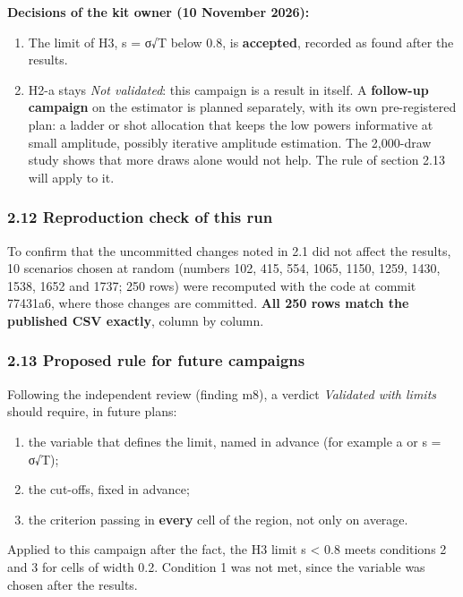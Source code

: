 \documentclass[
  10pt,
]{article}
\providecommand{\tightlist}{%
  \setlength{\itemsep}{0pt}\setlength{\parskip}{0pt}}
\begin{document}
\textbf{Decisions of the kit owner (10 November 2026):}

\begin{enumerate}
\def\labelenumi{\arabic{enumi}.}
\tightlist
\item
  The limit of H3, s = σ√T below 0.8, is \textbf{accepted}, recorded as
  found after the results.
\item
  H2-a stays \emph{Not validated}: this campaign is a result in itself.
  A \textbf{follow-up campaign} on the estimator is planned separately,
  with its own pre-registered plan: a ladder or shot allocation that
  keeps the low powers informative at small amplitude, possibly
  iterative amplitude estimation. The 2,000-draw study shows that more
  draws alone would not help. The rule of section 2.13 will apply to it.
\end{enumerate}

\hypertarget{212-reproduction-check-of-this-run}{%
\subsubsection{2.12 Reproduction check of this
run}\label{212-reproduction-check-of-this-run}}

To confirm that the uncommitted changes noted in 2.1 did not affect the
results, 10 scenarios chosen at random (numbers 102, 415, 554, 1065,
1150, 1259, 1430, 1538, 1652 and 1737; 250 rows) were recomputed with
the code at commit 77431a6, where those changes are committed.
\textbf{All 250 rows match the published CSV exactly}, column by column.

\hypertarget{213-proposed-rule-for-future-campaigns}{%
\subsubsection{2.13 Proposed rule for future
campaigns}\label{213-proposed-rule-for-future-campaigns}}

Following the independent review (finding m8), a verdict \emph{Validated
with limits} should require, in future plans:

\begin{enumerate}
\def\labelenumi{\arabic{enumi}.}
\tightlist
\item
  the variable that defines the limit, named in advance (for example a
  or s = σ√T);
\item
  the cut-offs, fixed in advance;
\item
  the criterion passing in \textbf{every} cell of the region, not only
  on average.
\end{enumerate}

Applied to this campaign after the fact, the H3 limit s \textless{} 0.8
meets conditions 2 and 3 for cells of width 0.2. Condition 1 was not
met, since the variable was chosen after the results.
\end{document}
